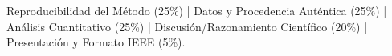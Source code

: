 \documentclass[11pt, a4paper]{article}
\begin{document}
\vspace{0.3cm}
\begin{tcolorbox}[colback=gray!5, colframe=black, title=\textbf{Pauta de Calidad Propuesta (Orientativa 30\% EC3)}]
\small Reproducibilidad del Método (25\%) | Datos y Procedencia Auténtica (25\%) | Análisis Cuantitativo (25\%) | Discusión/Razonamiento Científico (20\%) | Presentación y Formato IEEE (5\%).
\end{tcolorbox}
\end{document}
